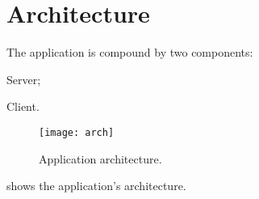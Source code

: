 \chapter{Architecture}\label{ch:arch}

The application is compound by two components:
\begin{enumerate*}[label=]
	\item Server;
	\item Client.
\end{enumerate*}

\begin{figure}[p]
	\centering
	\texttt{[image: arch]}
	\caption{Application architecture.}\label{fig:arch}
\end{figure}

 shows the application's architecture.




